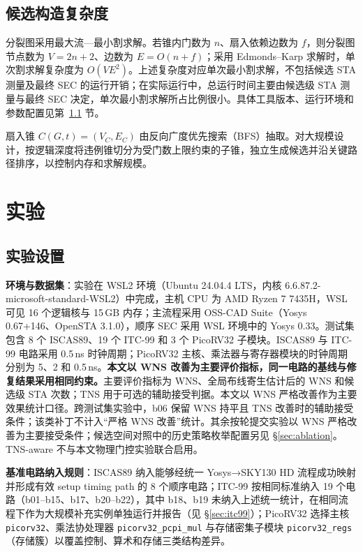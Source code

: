 \documentclass[twocolumn,10pt,fontset=windows]{ctexart}
\begin{document}
\subsection{候选构造复杂度}\label{sec:impl}

分裂图采用最大流—最小割求解。若锥内门数为 $n$、扇入依赖边数为 $f$，则分裂图节点数为 $V=2n+2$、边数为 $E=O(n+f)$；采用 Edmonds--Karp 求解时，单次割求解复杂度为 $O(VE^2)$。上述复杂度对应单次最小割求解，不包括候选 STA 测量及最终 SEC 的运行开销；在实际运行中，总运行时间主要由候选级 STA 测量与最终 SEC 决定，单次最小割求解所占比例很小。具体工具版本、运行环境和参数配置见第~\ref{sec:setup} 节。

扇入锥 $C(G, t) = (V_C, E_C)$ 由反向广度优先搜索（BFS）抽取。对大规模设计，按逻辑深度将违例锥切分为受门数上限约束的子锥，独立生成候选并沿关键路径排序，以控制内存和求解规模。

\section{实验}\label{sec:exp}

\subsection{实验设置}\label{sec:setup}

\textbf{环境与数据集}：实验在 WSL2 环境（Ubuntu 24.04.4 LTS，内核 6.6.87.2-microsoft-standard-WSL2）中完成，主机 CPU 为 AMD Ryzen 7 7435H，WSL 可见 16 个逻辑核与 15\,GB 内存；主流程采用 OSS-CAD Suite（Yosys 0.67+146、OpenSTA 3.1.0），顺序 SEC 采用 WSL 环境中的 Yosys 0.33。测试集包含 8 个 ISCAS89、19 个 ITC-99 和 3 个 PicoRV32 子模块。ISCAS89 与 ITC-99 电路采用 0.5\,ns 时钟周期；PicoRV32 主核、乘法器与寄存器模块的时钟周期分别为 5、2 和 0.5\,ns。\textbf{本文以 WNS 改善为主要评价指标，同一电路的基线与修复结果采用相同约束。}主要评价指标为 WNS、全局布线寄生估计后的 WNS 和候选级 STA 次数；TNS 用于可选的辅助接受判据。本文以 WNS 严格改善作为主要效果统计口径。跨测试集实验中，b06 保留 WNS 持平且 TNS 改善时的辅助接受条件；该类补丁不计入“严格 WNS 改善”统计。其余按轮提交实验以 WNS 严格改善为主要接受条件；候选空间对照中的历史策略枚举配置另见 \S\ref{sec:ablation}。TNS-aware 不与本文物理门控实验联合启用。

\textbf{基准电路纳入规则}：ISCAS89 纳入能够经统一 Yosys→SKY130 HD 流程成功映射并形成有效 setup timing path 的 8 个顺序电路；ITC-99 按相同标准纳入 19 个电路（b01--b15、b17、b20--b22），其中 b18、b19 未纳入上述统一统计，在相同流程下作为大规模补充实例单独运行并报告（见 \S\ref{sec:itc99}）；PicoRV32 选择主核 \texttt{picorv32}、乘法协处理器 \texttt{picorv32\_pcpi\_mul} 与存储密集子模块 \texttt{picorv32\_regs}（存储簇）以覆盖控制、算术和存储三类结构差异。
\end{document}
